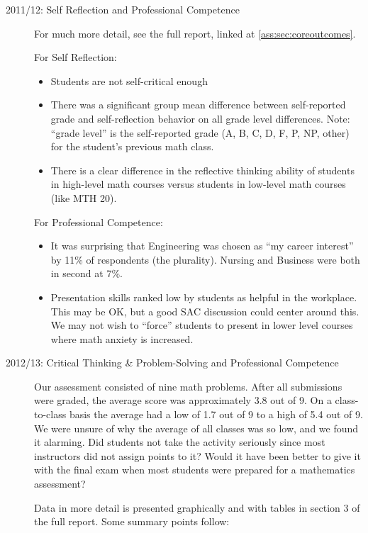 \begin{description}

\item[2011/12: Self Reflection and Professional Competence]
For much more detail, see the full report, linked at \cref{ass:sec:coreoutcomes}.

For Self Reflection: 
\begin{itemize}
\item Students are not self-critical enough
\item There was a significant group mean difference between self-reported grade and self-reflection behavior on all grade level differences.  Note: ``grade level'' is the self-reported grade (A, B, C, D, F, P, NP, other) for the student's previous math class.
\item There is a clear difference in the reflective thinking ability of students in high-level math courses versus students in low-level math courses (like MTH 20).
\end{itemize}
For Professional Competence:
\begin{itemize}
\item It was surprising that Engineering was chosen as ``my career interest'' by 11\% of respondents (the plurality). Nursing and Business were both in second at 7\%.\
\item Presentation skills ranked low by students as helpful in the workplace. This may be OK, but a good SAC discussion could center around this. We may not wish to ``force'' students to present in lower level courses where math anxiety is increased.
\end{itemize}

\item[2012/13:  Critical Thinking \& Problem-Solving and Professional Competence]

Our assessment consisted of nine math problems.  After all submissions were graded, the average score was approximately 3.8 out of 9.  On a class-to-class basis the average had a low of 1.7 out of 9 to a high of 5.4 out of 9.  We were unsure of why the average of all classes was so low, and we found it alarming.  Did students not take the activity seriously since most instructors did not assign points to it?  Would it have been better to give it with the final exam when most students were prepared for a mathematics assessment? 

Data in more detail is presented graphically and with tables in section 3 of the full report. Some summary points follow:


\end{description}
